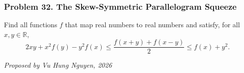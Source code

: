\subsubsection*{Problem 32. The Skew-Symmetric Parallelogram Squeeze}

\begin{exercisebox}[hard]

Find all functions $f$ that map real numbers to real numbers and
satisfy, for all $x,y\in\mathbb R$,
\[
2xy+x^2f(y)-y^2f(x)
\leq\frac{f(x+y)+f(x-y)}{2}
\leq f(x)+y^2.
\]

\begin{flushright}
\textit{Proposed by Vu Hung Nguyen, 2026}
\end{flushright}


\end{exercisebox}